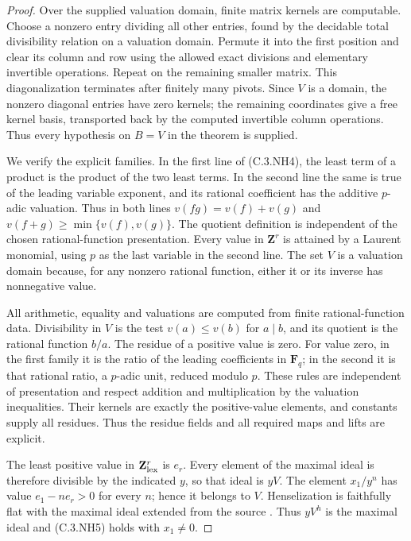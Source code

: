\begin{proof}
Over the supplied valuation domain,
finite matrix kernels are computable.
Choose a nonzero entry dividing all
other entries, found by the decidable
total divisibility relation on a
valuation domain.  Permute it into
the first position and clear its
column and row using the allowed
exact divisions and elementary
invertible operations.
Repeat on the remaining smaller
matrix.  This diagonalization
terminates after finitely many
pivots.  Since $V$ is a domain,
the nonzero diagonal entries
have zero kernels; the remaining
coordinates give a free kernel
basis, transported back by the
computed invertible column
operations.  Thus every hypothesis
on $B=V$ in the theorem is supplied.

We verify the explicit families.
In the first line of (C.3.NH4),
the least term of a product is
the product of the two least
terms.  In the second line the
same is true of the leading
variable exponent, and its
rational coefficient has the
additive $p$-adic valuation.
Thus in both lines
$v(fg)=v(f)+v(g)$ and
$v(f+g)\geq\min\{v(f),v(g)\}$.
The quotient definition is
independent of the chosen
rational-function presentation.
Every value in $\mathbf Z^r$
is attained by a Laurent
monomial, using $p$ as the
last variable in the second
line.  The set $V$ is a
valuation domain because,
for any nonzero rational
function, either it or its
inverse has nonnegative value.

All arithmetic, equality
and valuations are computed
from finite rational-function
data.  Divisibility in $V$
is the test $v(a)\leq v(b)$
for $a\mid b$, and its
quotient is the rational
function $b/a$.
The residue of a positive
value is zero.
For value zero, in the
first family it is the
ratio of the leading
coefficients in $\mathbf F_q$;
in the second it is that
rational ratio, a $p$-adic
unit, reduced modulo $p$.
These rules are independent
of presentation and respect
addition and multiplication
by the valuation inequalities.
Their kernels are exactly
the positive-value elements,
and constants supply all
residues.  Thus the residue
fields and all required
maps and lifts are explicit.

The least positive value
in $\mathbf Z^r_{\rm lex}$
is $e_r$.  Every element
of the maximal ideal is
therefore divisible by
the indicated $y$, so
that ideal is $yV$.
The element $x_1/y^n$
has value $e_1-ne_r>0$
for every $n$; hence it
belongs to $V$.
Henselization is faithfully
flat with the maximal ideal
extended from the source
\cite[Lemma 15.46.1, Tag 07QL]
 {C-StacksCoherentHenselizations}.
Thus $yV^h$ is the maximal
ideal and (C.3.NH5) holds
with $x_1\ne0$.


\end{proof}
